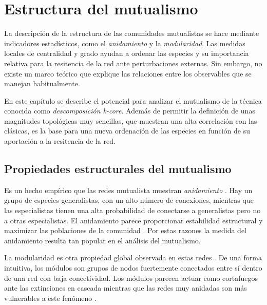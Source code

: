 
\chapter{Estructura del mutualismo} %
\label{ChapterESTATICA}  %


La descripción de la estructura de las comunidades mutualistas se hace mediante indicadores estadísticos, como el \textit{anidamiento}
y la \textit{modularidad}. Las medidas locales de centralidad y grado ayudan a ordenar las especies y su importancia relativa para
la resitencia de la red ante perturbaciones externas. Sin embargo, no existe un marco teórico que explique las relaciones entre los observables
que se manejan habitualmente.

En este capítulo se describe el potencial para analizar el mutualismo de la técnica conocida como \textit{descomposición k-core}. Además
de permitir la definición de unas magnitudes topológicas muy sencillas, que muestran una alta correlación con las clásicas, es la base
para una nueva ordenación de las especies en función de su aportación a la resitencia de la red.


\section{Propiedades estructurales del mutualismo}

Es un hecho empírico que las redes mutualista muestran \textit{anidamiento} \cite{bascompte2003nested}. Hay un grupo de especies generalistas, con un alto número de conexiones, mientras que las especialistas tienen una alta probabilidad de conectarse a generalistas pero no a otras especialistas. El anidamiento parece proporcionar estabilidad estructural y maximizar las poblaciones de la comunidad \cite{thebault2010stability, suweis2013emergence}. Por estas razones la medida del anidamiento resulta tan popular en el análisis del mutualismo. 

La modularidad es otra propiedad global observada en estas redes \cite{newman2004finding, olesen2007modularity}. De una forma intuitiva, los módulos son grupos de nodos fuertemente conectados entre sí dentro de una red con baja conectividad. Los módulos parecen actuar como cortafuegos ante las extinciones en cascada \cite{saavedra2011strong} mientras que las redes muy anidadas son más vulnerables a este fenómeno \cite{lever2014sudden}. 

